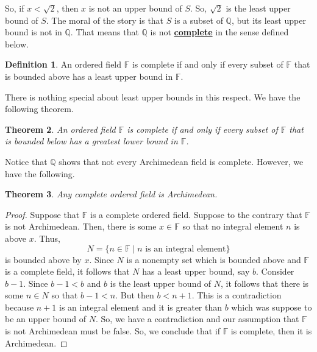 \documentclass[11pt]{article}
\newenvironment{task}
	{\begin{mdframed}[linecolor=lightgray, linewidth=3pt]\raggedright}
	{\end{mdframed}}
\renewcommand\emph[1]{\underline{\bf{#1}}} %
\newtheorem{theorem}{Theorem}[section]
\theoremstyle{definition}
\newtheorem{definition}[theorem]{Definition}
\begin{document}
\begin{task}
  So, if $x<\sqrt{2}$, then $x$ is not an upper bound of $S$. So, $\sqrt{2}$ is the least upper bound of $S$. The moral of the story is
  that $S$ is a subset of $\mathbb{Q}$, but its least upper bound is not in $\mathbb{Q}$. That means that $\mathbb{Q}$ is not \emph{complete}
  in the sense defined below.
\end{task}

\begin{definition}
  An ordered field $\mathbb{F}$ is complete if and only if every subset of $\mathbb{F}$ that is bounded above has a least upper bound in 
  $\mathbb{F}$.
\end{definition}

There is nothing special about least upper bounds in this respect. We have the following theorem.

\begin{theorem}
  An ordered field $\mathbb{F}$ is complete if and only if every subset of $\mathbb{F}$ that is bounded below has a greatest lower bound
  in $\mathbb{F}$.
  \label{theorem: alternate completeness axiom}
\end{theorem}

Notice that $\mathbb{Q}$ shows that not every Archimedean field is complete. However, we have the following.

\begin{theorem}
  Any complete ordered field is Archimedean.
  \label{theorem: complete implies archimedean}
\end{theorem}
\begin{proof}
  Suppose that $\mathbb{F}$ is a complete ordered field. Suppose to the contrary that $\mathbb{F}$ is not Archimedean. Then, there is
  some $x\in \mathbb{F}$ so that no integral element $n$ is above $x$. Thus,
  \[ N = \{ n \in \mathbb{F} \mid n \text{ is an integral element} \}\]
  is bounded above by $x$. Since $N$ is a nonempty set which is bounded above and $\mathbb{F}$ is a complete field, it follows that
  $N$ has a least upper bound, say $b$. Consider $b-1$. Since $b-1 < b$ and $b$ is the least upper bound of $N$, it follows that there is
  some $n \in N$ so that $b-1 < n$. But then $b < n+1$. This is a contradiction because $n+1$ is an integral element and it is greater
  than $b$ which was suppose to be an upper bound of $N$. So, we have a contradiction and our assumption that $\mathbb{F}$ is not
  Archimedean must be false. So, we conclude that if $\mathbb{F}$ is complete, then it is Archimedean.
\end{proof}
\end{document}
